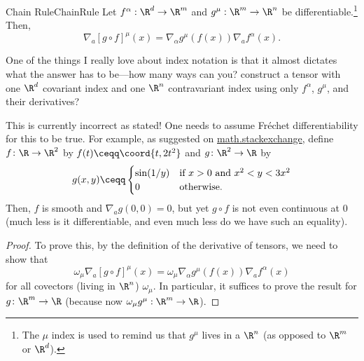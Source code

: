 \begin{prp}{Chain Rule}{ChainRule}
Let $f^\alpha :\R ^d\rightarrow \R ^m$ and $g^\mu :\R ^m\rightarrow \R ^n$ be differentiable.\footnote{The $\mu$ index is used to remind us that $g^\mu$ lives in a $\R ^n$ (as opposed to $\R ^m$ or $\R ^d$).}  Then,
\begin{equation}
\nabla _a[g\circ f]^\mu (x)=\nabla _\alpha g^\mu (f(x))\nabla _af^\alpha (x).
\end{equation}
\begin{rmk}
One of the things I really love about index notation is that it almost dictates what the answer has to be---how many ways can you? construct a tensor with one $\R ^d$ covariant index and one $\R ^n$ contravariant index using only $f^\alpha$, $g^\mu$, and their derivatives?
\end{rmk}
\begin{wrn}
This is currently incorrect as stated!  One needs to assume Fréchet differentiability for this to be true.  For example, as suggested on \href{http://math.stackexchange.com/questions/705847/counterexample-for-the-chain-rule-for-the-gateaux-derivative}{math.stackexchange}, define $f\colon \R \rightarrow \R ^2$ by $f(t)\ceqq \coord{t,2t^2}$ and $g\colon \R ^2\rightarrow \R$ by
\begin{equation*}
g(x,y)\ceqq \begin{cases}\sin (1/y) & \text{if }x>0\text{ and }x^2<y<3x^2 \\ 0 & \text{otherwise.}\end{cases}
\end{equation*}
Then, $f$ is smooth and $\nabla _ag(0,0)=0$, but yet $g\circ f$ is not even continuous at $0$ (much less is it differentiable, and even much less do we have such an equality).
\end{wrn}
\begin{proof}
To prove this, by the definition of the derivative of tensors, we need to show that
\begin{equation}
\omega _\mu \nabla _a[g\circ f]^\mu (x)=\omega _\mu \nabla _\alpha g^\mu (f(x))\nabla _af^\alpha (x)
\end{equation}
for all covectors (living in $\R ^n$) $\omega _\mu$.  In particular, it suffices to prove the result for $g\colon \R ^m\rightarrow \R$ (because now $\omega _\mu g^\mu :\R ^m\rightarrow \R$).


\end{proof}
\end{prp}

